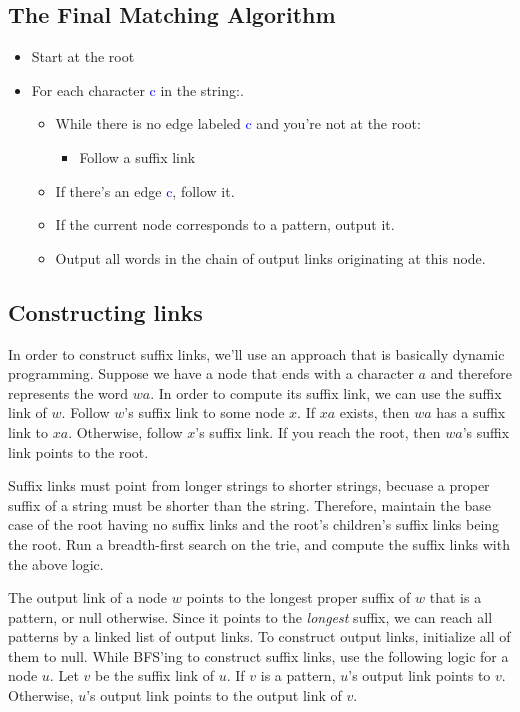 \documentclass[11pt, oneside]{article}
\begin{document}
\subsection{The Final Matching Algorithm}

\begin{itemize}
    \item Start at the root
    \item For each character \textcolor{blue}{c} in the string:.
      \begin{itemize}
        \item While there is no edge labeled \textcolor{blue}{c} and you're not at the root:
          \begin{itemize}
            \item Follow a suffix link
          \end{itemize}
        \item If there's an edge \textcolor{blue}{c}, follow it.
        \item If the current node corresponds to a pattern, output it.
        \item Output all words in the chain of output links originating at this node.
      \end{itemize}
\end{itemize}

\newpage

\subsection{Constructing links}

In order to construct suffix links, we'll use an approach that is basically dynamic programming.
Suppose we have a node that ends with a character \( a \) and therefore represents the word \( wa \).
In order to compute its suffix link, we can use the suffix link of \( w \).
Follow \( w \)'s suffix link to some node \( x \). If \( xa \) exists, then \( wa \) has a suffix link
to \( xa \). Otherwise, follow \( x \)'s suffix link. If you reach the root,
then \( wa \)'s suffix link points to the root.

Suffix links must point from longer strings to shorter strings, becuase a proper suffix of a string
must be shorter than the string. Therefore, maintain the base case of the root having no suffix links
and the root's children's suffix links being the root. Run a breadth-first search on the trie,
and compute the suffix links with the above logic.

The output link of a node \( w \) points to the longest proper suffix of \( w \) that is a pattern,
or null otherwise. Since it points to the \textit{longest} suffix, we can reach all patterns
by a linked list of output links. To construct output links, initialize all of them to null.
While BFS'ing to construct suffix links, use the following logic for a node \( u \).
Let \( v \) be the suffix link of \( u \). If \( v \) is a pattern, \( u \)'s output link
points to \( v \). Otherwise, \( u \)'s output link points to the output link of \( v \).
\end{document}
